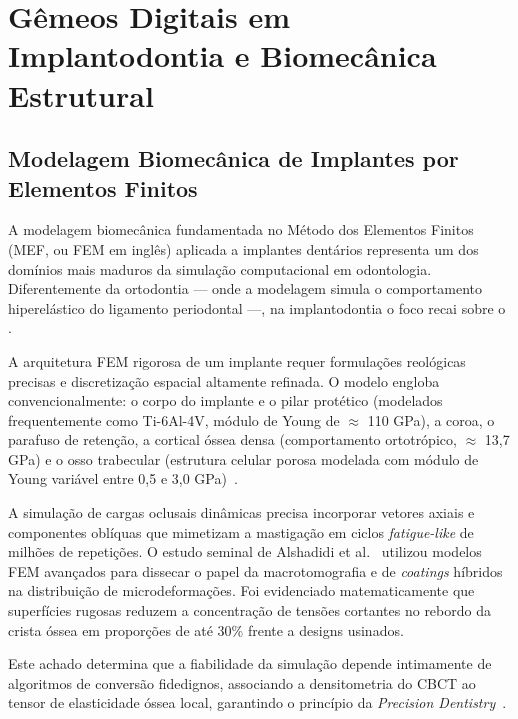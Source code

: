\section{Gêmeos Digitais em Implantodontia e Biomecânica Estrutural}

\subsection{Modelagem Biomecânica de Implantes por Elementos Finitos}

A modelagem biomecânica fundamentada no Método dos Elementos Finitos (MEF, ou FEM em inglês) aplicada a implantes dentários representa um dos domínios mais maduros da simulação computacional em odontologia. Diferentemente da ortodontia — onde a modelagem simula o comportamento hiperelástico do ligamento periodontal —, na implantodontia o foco recai sobre o .

A arquitetura FEM rigorosa de um implante requer formulações reológicas precisas e discretização espacial altamente refinada. O modelo engloba convencionalmente: o corpo do implante e o pilar protético (modelados frequentemente como Ti-6Al-4V, módulo de Young de $\approx$ 110 GPa), a coroa, o parafuso de retenção, a cortical óssea densa (comportamento ortotrópico, $\approx$ 13,7 GPa) e o osso trabecular (estrutura celular porosa modelada com módulo de Young variável entre 0,5 e 3,0 GPa)~\cite{li2025impacts}.

A simulação de cargas oclusais dinâmicas precisa incorporar vetores axiais e componentes oblíquas que mimetizam a mastigação em ciclos \textit{fatigue-like} de milhões de repetições. O estudo seminal de Alshadidi et al.~\cite{alshadidi2024surface} utilizou modelos FEM avançados para dissecar o papel da macrotomografia e de \textit{coatings} híbridos na distribuição de microdeformações. Foi evidenciado matematicamente que superfícies rugosas reduzem a concentração de tensões cortantes no rebordo da crista óssea em proporções de até 30\% frente a designs usinados. 

 Este achado determina que a fiabilidade da simulação depende intimamente de algoritmos de conversão fidedignos, associando a densitometria do CBCT ao tensor de elasticidade óssea local, garantindo o princípio da \textit{Precision Dentistry}~\cite{techsoc2025precision}.

